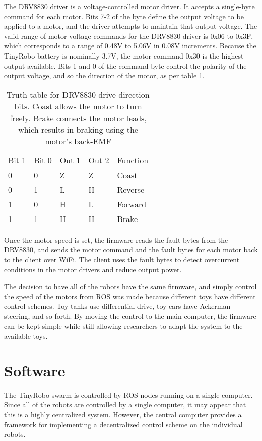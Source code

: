 \documentclass[]{article}
\begin{document}
The DRV8830 driver is a voltage-controlled motor driver. 
It accepts a single-byte command for each motor. 
Bits 7-2 of the byte define the output voltage to be applied to a motor, and the driver attempts to maintain that output voltage.
The valid range of motor voltage commands for the DRV8830 driver is 0x06 to 0x3F, which corresponds to a range of 0.48V to 5.06V in 0.08V increments. 
Because the TinyRobo battery is nominally 3.7V, the motor command 0x30 is the highest output available. 
Bits 1 and 0 of the command byte control the polarity of the output voltage, and so the direction of the motor, as per table \ref{tab:DRV8830_truth}.

\begin{table}
	\begin{tabular}{l|l|l|l|l}
	Bit 1 & Bit 0 & Out 1 & Out 2 & Function\\
	0 & 0 & Z & Z & Coast\\
	0 & 1 & L & H & Reverse\\
	1 & 0 & H & L & Forward\\
	1 & 1 & H & H & Brake\\				
	\end{tabular}
	
	\caption{Truth table for DRV8830 drive direction bits. Coast allows the motor to turn freely. Brake connects the motor leads, which results in braking using the motor's back-EMF}
	\label{tab:DRV8830_truth}
\end{table}

Once the motor speed is set, the firmware reads the fault bytes from the DRV8830, and sends the motor command and the fault bytes for each motor back to the client over WiFi. 
The client uses the fault bytes to detect overcurrent conditions in the motor drivers and reduce output power. 

The decision to have all of the robots have the same firmware, and simply control the speed of the motors from ROS was made because different toys have different control schemes. 
Toy tanks use differential drive, toy cars have Ackerman steering, and so forth. 
By moving the control to the main computer, the firmware can be kept simple while still allowing researchers to adapt the system to the available toys. 

\section{Software}

The TinyRobo swarm is controlled by ROS nodes running on a single computer.
Since all of the robots are controlled by a single computer, it may appear that this is a highly centralized system. 
However, the central computer provides a framework for implementing a decentralized control scheme on the individual robots. 
\end{document}
